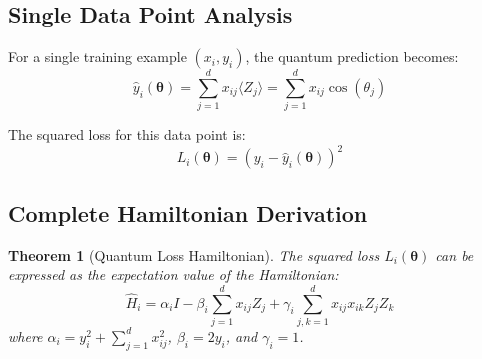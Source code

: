 \documentclass[11pt]{article}
\newtheorem{theorem}{Theorem}[section]
\begin{document}
\subsection{Single Data Point Analysis}

For a single training example $(x_i, y_i)$, the quantum prediction becomes:
\begin{equation}
\hat{y}_i(\bm{\theta}) = \sum_{j=1}^d x_{ij} \langle Z_j \rangle = \sum_{j=1}^d x_{ij} \cos(\theta_j)
\label{eq:quantum_prediction}
\end{equation}

The squared loss for this data point is:
\begin{equation}
L_i(\bm{\theta}) = (y_i - \hat{y}_i(\bm{\theta}))^2
\label{eq:single_loss}
\end{equation}

\subsection{Complete Hamiltonian Derivation}

\begin{theorem}[Quantum Loss Hamiltonian]
The squared loss $L_i(\bm{\theta})$ can be expressed as the expectation value of the Hamiltonian:
\begin{equation}
\hat{H}_i = \alpha_i I - \beta_i \sum_{j=1}^d x_{ij} Z_j + \gamma_i \sum_{j,k=1}^d x_{ij} x_{ik} Z_j Z_k
\label{eq:hamiltonian_general}
\end{equation}
where $\alpha_i = y_i^2 + \sum_{j=1}^d x_{ij}^2$, $\beta_i = 2y_i$, and $\gamma_i = 1$.
\end{theorem}
\end{document}
